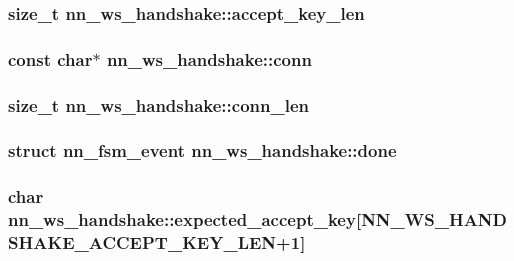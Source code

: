 \subsubsection[{accept\+\_\+key\+\_\+len}]{\setlength{\rightskip}{0pt plus 5cm}size\+\_\+t nn\+\_\+ws\+\_\+handshake\+::accept\+\_\+key\+\_\+len}\hypertarget{structnn__ws__handshake_ae4b845cff494c6c1fb5884f8ed3ebd8c}{}\label{structnn__ws__handshake_ae4b845cff494c6c1fb5884f8ed3ebd8c}
\subsubsection[{conn}]{\setlength{\rightskip}{0pt plus 5cm}const char$\ast$ nn\+\_\+ws\+\_\+handshake\+::conn}\hypertarget{structnn__ws__handshake_a39e9cea471ac3688cc9911c763328205}{}\label{structnn__ws__handshake_a39e9cea471ac3688cc9911c763328205}
\subsubsection[{conn\+\_\+len}]{\setlength{\rightskip}{0pt plus 5cm}size\+\_\+t nn\+\_\+ws\+\_\+handshake\+::conn\+\_\+len}\hypertarget{structnn__ws__handshake_a269c67abfd22c22f4a9574fe6385f085}{}\label{structnn__ws__handshake_a269c67abfd22c22f4a9574fe6385f085}
\subsubsection[{done}]{\setlength{\rightskip}{0pt plus 5cm}struct {\bf nn\+\_\+fsm\+\_\+event} nn\+\_\+ws\+\_\+handshake\+::done}\hypertarget{structnn__ws__handshake_a29e3a8e55ea0e660734b1e242d1e6e1f}{}\label{structnn__ws__handshake_a29e3a8e55ea0e660734b1e242d1e6e1f}
\subsubsection[{expected\+\_\+accept\+\_\+key}]{\setlength{\rightskip}{0pt plus 5cm}char nn\+\_\+ws\+\_\+handshake\+::expected\+\_\+accept\+\_\+key\mbox{[}{\bf N\+N\+\_\+\+W\+S\+\_\+\+H\+A\+N\+D\+S\+H\+A\+K\+E\+\_\+\+A\+C\+C\+E\+P\+T\+\_\+\+K\+E\+Y\+\_\+\+L\+EN}+1\mbox{]}}\hypertarget{structnn__ws__handshake_a6900b8db78f0e831cc5cbb88cbfa2756}{}\label{structnn__ws__handshake_a6900b8db78f0e831cc5cbb88cbfa2756}
